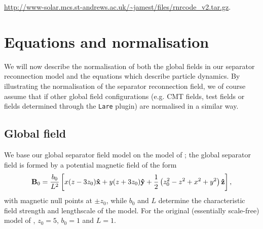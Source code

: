 \documentclass[a4paper,11pt,usenames,dvipsnames]{article}
\begin{document}
{\small \url{http://www-solar.mcs.st-andrews.ac.uk/~jamest/files/rnrcode_v2.tar.gz}}.

\section{Equations and normalisation}\label{sec:norm}
We will now describe the normalisation of both the global fields in our separator reconnection model and the equations which describe particle dynamics. By illustrating the normalisation of the separator reconnection field, we of course assume that if other global field configurations (e.g. CMT fields, test fields or fields determined through the {\tt{Lare}} plugin) are normalised in a similar way.

\subsection{Global field}
We base our global separator field model on the model of \citet{paper:Wilmot-SmithHornig2011}; the global separator field is formed by a potential magnetic field of the form 
 \begin{equation*}
  {\bf{B}}_0=\frac{b_0}{L^2}\left[x(z-3z_0){\bf{\hat{x}}}+y(z+3z_0){\bf{\hat{y}}}+\frac{1}{2}\left( z_0^2-z^2+x^2+y^2\right) {\bf{\hat{z}}} \right], 
 \end{equation*}
 with magnetic null points at $\pm{z_0}$, while $b_0$ and $L$ determine the characteristic field strength and lengthscale of the model. For the original (essentially scale-free) model of \citet{paper:Wilmot-SmithHornig2011}, $z_0=5$, $b_0=1$ and $L=1$.
\end{document}
